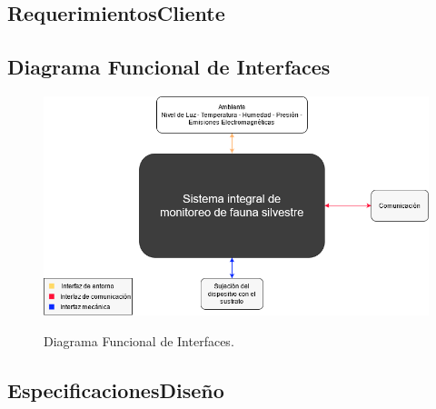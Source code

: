 



\subsection{RequerimientosCliente}
\label{sec:RequerimientosCliente}


\subsection{Diagrama Funcional de Interfaces}
\label{sec:DiagramaInterfaces}
\begin{figure}[H]
	\centering
	\includegraphics[width=\linewidth]{ImagenesDefinicion/func}
	\label{fig:diagrama_func_interfaces}
	\caption{Diagrama Funcional de Interfaces.}
\end{figure}

\subsection{EspecificacionesDiseño}
\label{sec:EspecificacionesDiseño}


